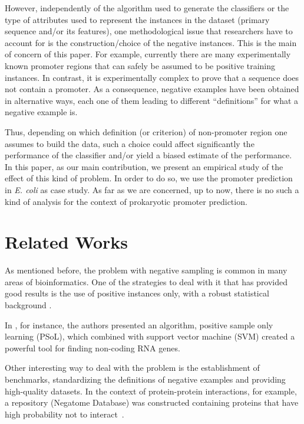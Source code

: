 \documentclass[conference]{IEEEtran}
\begin{document}
However, independently of the algorithm used to generate the classifiers or the type of attributes used to represent the instances in the dataset (primary sequence and/or its features), one methodological issue that researchers have to account for is the construction/choice of the negative instances. This is the main of concern of this paper. For example, currently there are many experimentally known promoter regions that can safely be assumed to be positive training instances. In contrast, it is experimentally complex to prove that a sequence does not contain a promoter. As a consequence, negative examples have been obtained in alternative ways, each one of them leading to different ``definitions'' for what a negative example is. 

Thus, depending on which definition (or criterion) of non-promoter region one assumes to build the data, such a choice could affect significantly the performance of the classifier and/or yield a biased estimate of the performance. In this paper, as our main contribution, we present an empirical study of the effect of this kind of problem. In order to do so, we use the promoter prediction in {\it E. coli} as case study. As far as we are concerned, up to now, there is no such a kind of analysis for the context of prokaryotic promoter prediction.

\section{Related Works}
\label{sec:related}

As mentioned before, the problem with negative sampling is common in many areas of bioinformatics. One of the strategies to deal with it that has provided good results is the use of positive instances only, with a robust statistical background \cite{cerulo2010,wang2006,yousef2008}. 

In \cite{wang2006}, for instance, the authors presented an algorithm, positive sample only learning (PSoL), which combined with support vector machine (SVM) created a powerful tool for finding non-coding RNA genes. 

Other interesting way to deal with the problem is the establishment of benchmarks, standardizing the definitions of negative examples and providing high-quality datasets. In the context of protein-protein interactions, for example, a repository (Negatome Database) was constructed containing proteins that have high probability not to interact~\cite{smialowski2010}.
\end{document}
